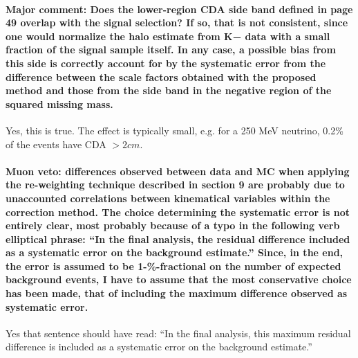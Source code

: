 \documentclass[12pt]{report}
\begin{document}
\paragraph{Major comment: Does the lower-region CDA side band defined in page 49 overlap with the signal
    selection? If so, that is not consistent, since one would normalize the halo estimate from K−
    data with a small fraction of the signal sample itself. In any case, a possible bias from this
    side is correctly account for by the systematic error from the difference between the scale factors
    obtained with the proposed method and those from the side band in the negative region of the
squared missing mass.}
Yes, this is true. The effect is typically small, e.g. for a 250 MeV neutrino, 0.2\% of the events
have CDA $> 2cm$.



\paragraph{Muon veto: differences observed between data and MC when applying the re-weighting technique described in section 9 are probably due to unaccounted correlations between kinematical variables within the correction method. The choice determining the systematic error is not entirely clear, most probably because of a typo in the following verb elliptical phrase: ``In the final analysis, the residual difference included as a systematic error on the background estimate.'' Since, in the end, the error is assumed to be 1-\%-fractional on the number of expected background events, I have to assume that the most conservative choice has been made, that of including the maximum difference observed as systematic error.
}

Yes that sentence should have read: ``In the final analysis, this maximum residual difference is included as a systematic error on the background estimate.''
\end{document}
